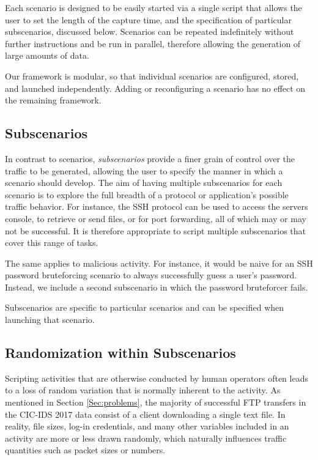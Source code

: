 \documentclass[sigconf]{acmart}
\begin{document}
Each scenario is designed to be easily started via a single script that allows the user to set the length of the capture time, and the specification of particular subscenarios, discussed below. Scenarios can be repeated indefinitely without further instructions and be run in parallel, therefore allowing the generation of large amounts of data.

Our framework is modular, so that individual scenarios are configured, stored, and launched independently. Adding or reconfiguring a scenario has no effect on the remaining framework.

\subsection{Subscenarios} \label{Sec:Subscenarios}

In contrast to scenarios, \textit{subscenarios} provide a finer grain of control over the traffic to be generated, allowing the user to specify the manner in which a scenario should develop. The aim of having multiple subscenarios for each scenario is to explore the full breadth of a protocol or application's possible traffic behavior. For instance, the SSH protocol can be used to access the servers console, to retrieve or send files, or for port forwarding, all of which may or may not be successful. It is therefore appropriate to script multiple subscenarios that cover this range of tasks.

The same applies to malicious activity. For instance, it would be naive for an SSH password bruteforcing scenario to always successfully guess a user's password. Instead, we include a second subscenario in which the password bruteforcer fails.

Subscenarios are specific to particular scenarios and can be specified when launching that scenario.

\subsection{Randomization within Subscenarios}\label{Sec:randomsubscen}

Scripting activities that are otherwise conducted by human operators often leads to a loss of random variation that is normally inherent to the activity.
As mentioned in Section \ref{Sec:problems}, the majority of successful FTP transfers in the CIC-IDS 2017 data consist of a client downloading a single text file. In reality, file sizes, log-in credentials, and many other variables included in an activity are more or less drawn randomly, which naturally influences traffic quantities such as packet sizes or numbers.
\end{document}
